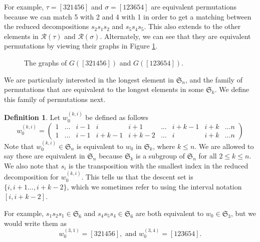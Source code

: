 \documentclass[11pt,reqno]{amsart}
\theoremstyle{definition}
\newtheorem{definition}[theorem]{Definition}
\theoremstyle{notation}
\newcommand{\calR}{\mathcal{R}}
\newcommand{\Sym}{\mathfrak{S}}
\begin{document}
For example, $\tau =[321456]$ and $\sigma = [123654]$ are equivalent permutations because we can match 5 with 2 and 4 with 1 in order to get a matching between the reduced decompositions $s_2s_1s_2$ and $s_5s_4s_5$. This also extends to the other elements in $\calR(\tau)$ and $\calR(\sigma)$. Alternately, we can see that they are equivalent permutations by viewing their graphs in Figure \ref{fig:equiv_graphs}.
\begin{figure}[H]
\begin{center}
\vspace{0.1in}
\caption{The graphs of $G([321456])$ and $G([123654])$.}
\label{fig:equiv_graphs}
\end{center}
\end{figure}

We are particularly interested in the longest element in $\Sym_n$, and the family of permutations that are equivalent to the longest elements in some $\Sym_k$. We define this family of permutations next. 


\begin{definition}\label{w0equiv}
Let $w_0^{(k,i)}$ be defined as follows
\[ 
w_0^{(k,i)}=\left ( \begin{array}{cccccccccc} 1 & \ldots & i-1 & i & i+1 & \ldots & i+k-1 & i+k & \ldots n \\
1 & \ldots &i-1 & i+k-1 & i+k-2 & \ldots & i & i+k & \ldots n
\end{array}\right )
\] 
Note that $w_0^{(k,i)}\in \mathfrak{S}_n$ is equivalent to $w_0$ in $\mathfrak{S}_k$, where $k\leq n$. We are allowed to say these are equivalent in $\mathfrak{S}_n$ because $\mathfrak{S}_k$ is a subgroup of $\mathfrak{S}_n$ for all $2\leq k \leq n$. We also note that $s_i$ is the transposition with the smallest index in the reduced decomposition for  $w_0^{(k,i)}$. This tells us that the descent set is $\{ i,i+1\ldots ,i+k-2\}$, which we sometimes refer to using the interval notation $[i,i+k-2]$.
\end{definition}


For example, $s_1s_2s_1\in \mathfrak{S}_6$ and $s_4s_5s_4\in \mathfrak{S}_6$ are both equivalent to $w_0\in \mathfrak{S}_3$, but we would write them as 
\[
w_0^{(3,1)}  = [321456],
 \mbox{ and } w_0^{(3,4)}  = [123654] .
\]
\end{document}
